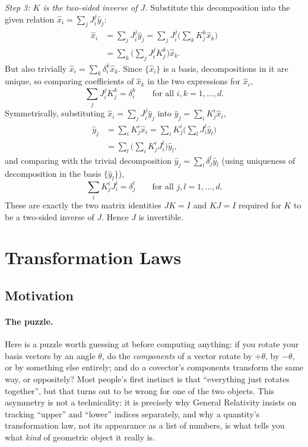 \documentclass[11pt]{article}
\begin{document}
\emph{Step 3: $K$ is the two-sided inverse of $J$.} Substitute this decomposition into the given relation $\hat x_i=\sum_jJ_i^j\hat y_j$:
\begin{align*}
\hat x_i &=\sum_jJ_i^j\hat y_j =\sum_jJ_i^j\Big(\sum_kK_j^k\hat x_k\Big) \\
&=\sum_k\Big(\sum_jJ_i^jK_j^k\Big)\hat x_k.
\end{align*}
But also trivially $\hat x_i=\sum_k\delta_i^k\hat x_k$. Since $\{\hat x_i\}$ is a basis, decompositions in it are unique, so comparing coefficients of $\hat x_k$ in the two expressions for $\hat x_i$,
\[
\sum_jJ_i^jK_j^k=\delta_i^k \qquad \text{for all } i,k=1,\dots,d.
\]
Symmetrically, substituting $\hat x_i=\sum_jJ_i^j\hat y_j$ into $\hat y_j=\sum_iK_j^i\hat x_i$,
\begin{align*}
\hat y_j &=\sum_iK_j^i\hat x_i =\sum_iK_j^i\Big(\sum_lJ_i^l\hat y_l\Big) \\
&=\sum_l\Big(\sum_iK_j^iJ_i^l\Big)\hat y_l,
\end{align*}
and comparing with the trivial decomposition $\hat y_j=\sum_l\delta_j^l\hat y_l$ (using uniqueness of decomposition in the basis $\{\hat y_l\}$),
\[
\sum_iK_j^iJ_i^l=\delta_j^l \qquad \text{for all } j,l=1,\dots,d.
\]
These are exactly the two matrix identities $JK=I$ and $KJ=I$ required for $K$ to be a two-sided inverse of $J$. Hence $J$ is invertible.

\section{Transformation Laws}

\subsection*{Motivation}

\paragraph{The puzzle.}
Here is a puzzle worth guessing at before computing anything: if you rotate your basis vectors by an angle $\theta$, do the \emph{components} of a vector rotate by $+\theta$, by $-\theta$, or by something else entirely; and do a covector's components transform the same way, or oppositely? Most people's first instinct is that ``everything just rotates together'', but that turns out to be wrong for one of the two objects. This asymmetry is not a technicality: it is precisely why General Relativity insists on tracking ``upper'' and ``lower'' indices separately, and why a quantity's transformation law, not its appearance as a list of numbers, is what tells you what \emph{kind} of geometric object it really is.
\end{document}
